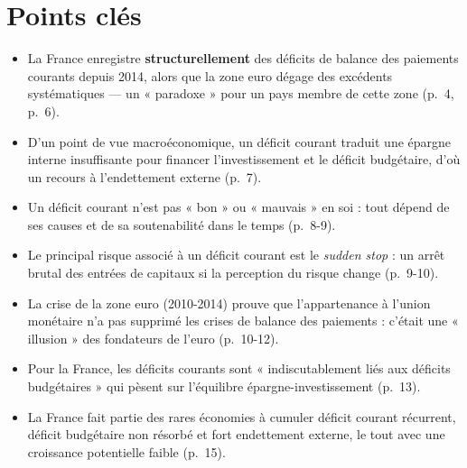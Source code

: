 \documentclass[11pt,a4paper]{article}
\begin{document}
\section{Points clés}
\begin{itemize}
  \item La France enregistre \textbf{structurellement} des déficits de balance des
  paiements courants depuis 2014, alors que la zone euro dégage des excédents
  systématiques — un « paradoxe » pour un pays membre de cette zone (p.~4, p.~6).
  \item D'un point de vue macroéconomique, un déficit courant traduit une épargne
  interne insuffisante pour financer l'investissement et le déficit budgétaire,
  d'où un recours à l'endettement externe (p.~7).
  \item Un déficit courant n'est pas « bon » ou « mauvais » en soi : tout dépend de
  ses causes et de sa soutenabilité dans le temps (p.~8-9).
  \item Le principal risque associé à un déficit courant est le \textit{sudden stop} :
  un arrêt brutal des entrées de capitaux si la perception du risque change (p.~9-10).
  \item La crise de la zone euro (2010-2014) prouve que l'appartenance à l'union
  monétaire n'a pas supprimé les crises de balance des paiements : c'était une
  « illusion » des fondateurs de l'euro (p.~10-12).
  \item Pour la France, les déficits courants sont « indiscutablement liés aux
  déficits budgétaires » qui pèsent sur l'équilibre épargne-investissement (p.~13).
  \item La France fait partie des rares économies à cumuler déficit courant
  récurrent, déficit budgétaire non résorbé et fort endettement externe, le tout
  avec une croissance potentielle faible (p.~15).
\end{itemize}
\end{document}
